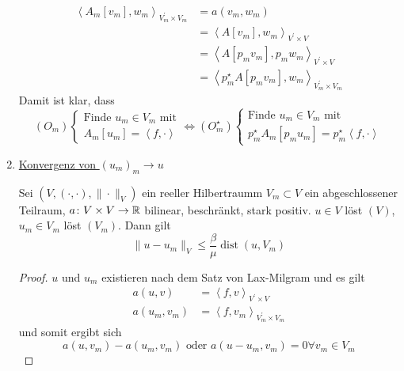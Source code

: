 \begin{enumerate}
\begin{align*}
			\left<A_{m}\left[v_{m}\right],w_{m}\right>_{V_{m}^{\prime}\times V_{m}} &= a\left(v_{m},w_{m}\right)\\
				&= \left<A\left[v_{m}\right],w_{m}\right>_{V^{\prime}\times V}\\
				&= \left<A\left[p_{m}v_{m}\right],p_{m}w_{m}\right>_{V^{\prime}\times V}\\
				&= \left<p_{m}^{\star}A\left[p_{m}v_{m}\right],w_{m}\right>_{V_{m}^{\prime}\times V_{m}}
		\end{align*}
		Damit ist klar, dass
		\begin{equation*}
			\left(O_{m}\right)\begin{cases}
				\text{Finde }u_{m}\in V_{m}\text{ mit}\\
				A_{m}\left[u_{m}\right] = \left<f,\cdot\right>
			\end{cases}
			\Leftrightarrow{}
			\left(O_{m}^{\star}\right)\begin{cases}
				\text{Finde }u_{m}\in V_{m}\text{ mit}\\
				p_{m}^{\star}A_{m}\left[p_{m}u_{m}\right] = p_{m}^{\star}\left<f,\cdot\right>
			\end{cases}
		\end{equation*}
	\item \underline{Konvergenz von $\left(u_{m}\right)_{m}\to u$}
		\begin{lemma}
			Sei $\left(V,\left(\cdot,\cdot\right),\|\cdot\|_{V}\right)$ ein reeller Hilbertraumm $V_{m}\subset V$ ein abgeschlossener Teilraum, $a\colon V\times V\to \mathbb{R}$ bilinear, beschränkt, stark positiv. $u\in V$ löst $\left(V\right)$, $u_{m}\in V_{m}$ löst $\left(V_{m}\right)$. Dann gilt
			\begin{equation*}
				\|u-u_{m}\|_{V} \leq \frac{\beta}{\mu}\operatorname{dist}\left(u,V_{m}\right)
			\end{equation*}
		\end{lemma}
		\begin{proof}
			$u$ und $u_{m}$ existieren nach dem Satz von Lax-Milgram und es gilt
			\begin{align*}
				a\left(u,v\right) &= \left<f,v\right>_{V^{\prime}\times V}\\
				a\left(u_{m},v_{m}\right) &= \left<f,v_{m}\right>_{V_{m}^{\prime}\times V_{m}}
			\end{align*}
			und somit ergibt sich
			\begin{equation*}
				a\left(u,v_{m}\right) - a\left(u_{m},v_{m}\right) \text{ oder } a\left(u-u_{m},v_{m}\right) = 0 \forall v_{m}\in V_{m}

\end{equation*}
\end{proof}
\end{enumerate}

